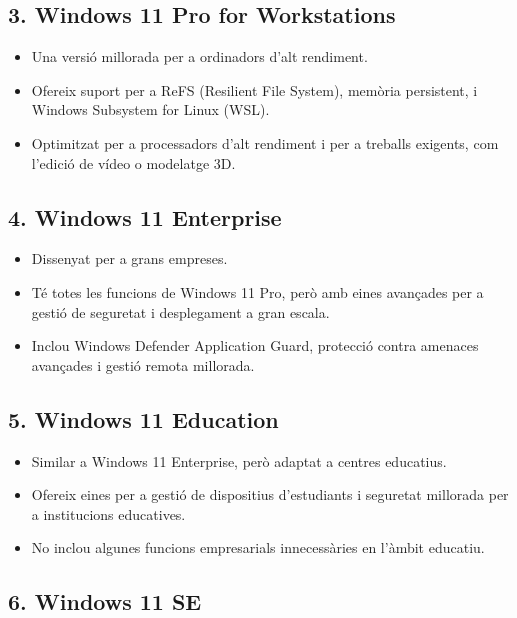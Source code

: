 \documentclass[
  12 pt,
  a4paper,
]{article}
\providecommand{\tightlist}{%
  \setlength{\itemsep}{0pt}\setlength{\parskip}{0pt}}
\begin{document}
\subsection{3. Windows 11 Pro for
Workstations}\label{windows-11-pro-for-workstations}

\begin{itemize}
\tightlist
\item
  Una versió millorada per a ordinadors d'alt rendiment.
\item
  Ofereix suport per a ReFS (Resilient File System), memòria persistent,
  i Windows Subsystem for Linux (WSL).
\item
  Optimitzat per a processadors d'alt rendiment i per a treballs
  exigents, com l'edició de vídeo o modelatge 3D.
\end{itemize}

\subsection{4. Windows 11 Enterprise}\label{windows-11-enterprise}

\begin{itemize}
\tightlist
\item
  Dissenyat per a grans empreses.
\item
  Té totes les funcions de Windows 11 Pro, però amb eines avançades per
  a gestió de seguretat i desplegament a gran escala.
\item
  Inclou Windows Defender Application Guard, protecció contra amenaces
  avançades i gestió remota millorada.
\end{itemize}

\subsection{5. Windows 11 Education}\label{windows-11-education}

\begin{itemize}
\tightlist
\item
  Similar a Windows 11 Enterprise, però adaptat a centres educatius.
\item
  Ofereix eines per a gestió de dispositius d'estudiants i seguretat
  millorada per a institucions educatives.
\item
  No inclou algunes funcions empresarials innecessàries en l'àmbit
  educatiu.
\end{itemize}

\subsection{6. Windows 11 SE}\label{windows-11-se}
\end{document}
